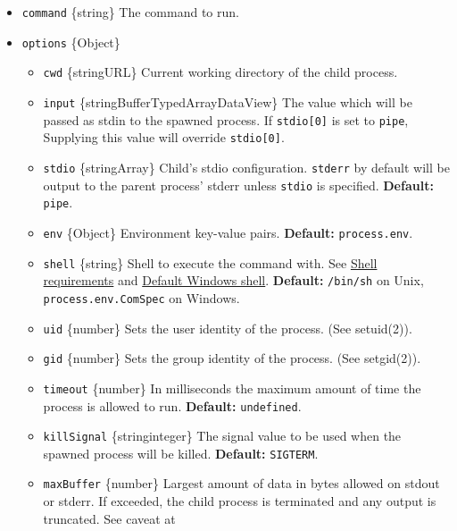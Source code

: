 \begin{itemize}
\tightlist
\item
  \texttt{command} \{string\} The command to run.
\item
  \texttt{options} \{Object\}

  \begin{itemize}
  \tightlist
  \item
    \texttt{cwd} \{string\textbar URL\} Current working directory of the
    child process.
  \item
    \texttt{input}
    \{string\textbar Buffer\textbar TypedArray\textbar DataView\} The
    value which will be passed as stdin to the spawned process. If
    \texttt{stdio{[}0{]}} is set to
    \texttt{\textquotesingle{}pipe\textquotesingle{}}, Supplying this
    value will override \texttt{stdio{[}0{]}}.
  \item
    \texttt{stdio} \{string\textbar Array\} Child's stdio configuration.
    \texttt{stderr} by default will be output to the parent process'
    stderr unless \texttt{stdio} is specified. \textbf{Default:}
    \texttt{\textquotesingle{}pipe\textquotesingle{}}.
  \item
    \texttt{env} \{Object\} Environment key-value pairs.
    \textbf{Default:} \texttt{process.env}.
  \item
    \texttt{shell} \{string\} Shell to execute the command with. See
    \hyperref[shell-requirements]{Shell requirements} and
    \hyperref[default-windows-shell]{Default Windows shell}.
    \textbf{Default:}
    \texttt{\textquotesingle{}/bin/sh\textquotesingle{}} on Unix,
    \texttt{process.env.ComSpec} on Windows.
  \item
    \texttt{uid} \{number\} Sets the user identity of the process. (See
    setuid(2)).
  \item
    \texttt{gid} \{number\} Sets the group identity of the process. (See
    setgid(2)).
  \item
    \texttt{timeout} \{number\} In milliseconds the maximum amount of
    time the process is allowed to run. \textbf{Default:}
    \texttt{undefined}.
  \item
    \texttt{killSignal} \{string\textbar integer\} The signal value to
    be used when the spawned process will be killed. \textbf{Default:}
    \texttt{\textquotesingle{}SIGTERM\textquotesingle{}}.
  \item
    \texttt{maxBuffer} \{number\} Largest amount of data in bytes
    allowed on stdout or stderr. If exceeded, the child process is
    terminated and any output is truncated. See caveat at

\end{itemize}
\end{itemize}
